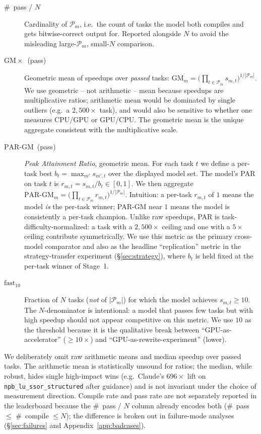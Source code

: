 \documentclass{article}
\begin{document}
\begin{description}
\item[\#~pass / $N$] Cardinality of $\mathcal{P}_m$, i.e.\ the count of tasks
  the model both compiles and gets bitwise-correct output for.
  Reported alongside $N$ to avoid the misleading large-$\mathcal{P}_m$,
  small-$N$ comparison.

\item[$\mathrm{GM}\!\times$~(pass)]
  Geometric mean of speedups over \emph{passed} tasks:
  $\mathrm{GM}_m = \big(\prod_{t \in \mathcal{P}_m} s_{m,t}\big)^{1/|\mathcal{P}_m|}$.
  We use geometric -- not arithmetic -- mean because speedups are
  multiplicative ratios; arithmetic mean would be dominated by single
  outliers (e.g.\ a $2{,}500\times$ task), and would also be sensitive to
  whether one measures CPU/GPU or GPU/CPU. The geometric mean is the
  unique aggregate consistent with the multiplicative scale.

\item[$\mathrm{PAR}$-$\mathrm{GM}$~(pass)] \emph{Peak Attainment Ratio},
  geometric mean. For each task $t$ we define a per-task best
  $b_t = \max_{m'} s_{m',t}$ over the displayed model set. The model's PAR
  on task $t$ is $r_{m,t} = s_{m,t} / b_t \in [0, 1]$. We then aggregate
  $\mathrm{PAR}\text{-}\mathrm{GM}_m =
   \big(\prod_{t \in \mathcal{P}_m} r_{m,t}\big)^{1/|\mathcal{P}_m|}$.
  Intuition: a per-task $r_{m,t}$ of $1$ means the model \emph{is} the
  per-task winner; PAR-GM near $1$ means the model is consistently a
  per-task champion. Unlike raw speedups, PAR is task-difficulty-normalized:
  a task with a $2{,}500\times$ ceiling and one with a $5\times$ ceiling
  contribute symmetrically. We use this metric as the primary cross-model
  comparator and also as the headline ``replication'' metric in the
  strategy-transfer experiment (\S\ref{sec:strategy}), where $b_t$ is held
  fixed at the per-task winner of Stage~1.

\item[$\mathrm{fast}_{10}$] Fraction of $N$ tasks (\emph{not} of
  $|\mathcal{P}_m|$) for which the model achieves $s_{m,t} \geq 10$. The
  $N$-denominator is intentional: a model that passes few tasks but with
  high speedup should not appear competitive on this metric. We use $10$
  as the threshold because it is the qualitative break between
  ``GPU-as-accelerator'' ($\geq 10\times$) and ``GPU-as-rewrite-experiment''
  (lower).
\end{description}

We deliberately omit raw arithmetic means and median speedup over passed
tasks. The arithmetic mean is statistically unsound for ratios; the
median, while robust, hides single high-impact wins (e.g.\ Claude's
$696\times$ lift on \texttt{npb\_lu\_ssor\_structured} after guidance) and
is not invariant under the choice of measurement direction. Compile rate
and pass rate are not separately reported in the leaderboard because the
\#~pass / $N$ column already encodes both ($\#$~pass $\leq$ \#~compile
$\leq N$); the difference is broken out in failure-mode analyses
(\S\ref{sec:failures} and Appendix~\ref{app:badcases}).
\end{document}
